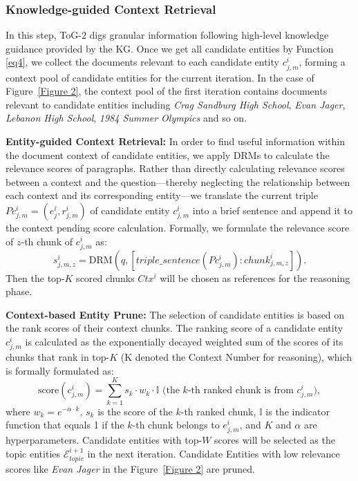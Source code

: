 \documentclass{article} %
\begin{document}
\subsubsection{Knowledge-guided Context Retrieval}
In this step, ToG-$2$ digs granular information following high-level knowledge guidance provided by the KG. Once we get all candidate entities by Function \ref{eq4}, we collect the documents relevant to each candidate entity $c_{j,m}^i$, forming a context pool of candidate entities for the current iteration. In the case of Figure~\ref{Figure 2}, the context pool of the first iteration contains documents relevant to candidate entities including  \textit{Crag Sandburg High School}, \textit{Evan Jager}, \textit{Lebanon High School}, \textit{1984 Summer Olympics} and so on.  

\textbf{Entity-guided Context Retrieval:}
In order to find useful information within the document context of candidate entities, we apply DRMs to calculate the relevance scores of paragraphs.
Rather than directly calculating relevance scores between a context and the question—thereby neglecting the relationship between each context and its corresponding entity—we translate the current triple $Pc_{j,m}^i = (e_j^i, r_{j,m}^i)$ of candidate entity $c_{j,m}^i$ into a brief sentence and append it to the context pending score calculation. Formally, we formulate the relevance score of $z$-th chunk of $c_{j,m}^i$ as: 
\begin{equation}
s_{j,m,z}^i = \text{DRM}(q, [triple\_sentence(Pc_{j,m}^i): chunk_{j,m,z}^i])\text{.}
\end{equation}
Then the top-$K$ scored chunks $Ctx^i$ will be chosen as references for the reasoning phase.

\textbf{Context-based Entity Prune:}
The selection of candidate entities is based on the rank scores of their context chunks.
The ranking score of a candidate entity $c_{j,m}^i$ is calculated as the exponentially decayed weighted sum of the scores of its chunks that rank in top-$K$ (K denoted the Context Number for reasoning),
which is formally formulated as: 
\begin{equation}
    \text{score}(c_{j,m}^i) = \sum_{k=1}^{K} s_k \cdot w_k \cdot \mathbb{I}\text{ (the }k\text{-th ranked chunk} \text{ is from } c_{j,m}^i\text{)},
\end{equation}
where
$
w_k = e^{-\alpha \cdot k }
$, 
$ s_k$ is the score of the \( k \)-th ranked chunk, \( \mathbb{I} \) is the indicator function that equals 1 if the \( k \)-th chunk belongs to \( e_{j,m}^i \), and \( K \) and \( \alpha \) are hyperparameters. Candidate entities with top-$W$ scores will be selected as the topic entities $\mathcal{E}_{topic}^{i+1}$ in the next iteration. Candidate Entities with low relevance scores like \textit{Evan Jager} in the Figure~\ref{Figure 2} are pruned.
\end{document}
